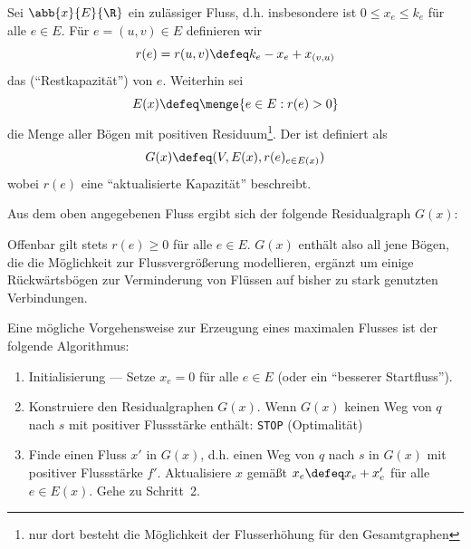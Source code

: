 \begin{definition}
	Sei $\abb{x}{E}{\R}$ ein zulässiger Fluss, d.h. insbesondere ist $0 \le x_e \le k_e$ für alle $e \in E$. Für $e = (u,v) \in E$ definieren wir
	\begin{equation*}
		r(e) = r(u,v) \defeq k_e - x_e + x_{(v,u)}
	\end{equation*}
	das  (\enquote{Restkapazität}) von $e$.
	Weiterhin sei
	\begin{equation*}
		E(x) \defeq \menge{e \in E : r(e) > 0}
	\end{equation*}
	die Menge aller Bögen mit positiven Residuum\footnote{nur dort besteht die Möglichkeit der Flusserhöhung für den Gesamtgraphen}. Der  ist definiert als 
	\begin{equation*}
		G(x) \defeq (V, E(x), r(e)_{e \in E(x)})
	\end{equation*}
	wobei $r(e)$ eine \enquote{aktualisierte Kapazität} beschreibt.
\end{definition}

\begin{beispiel}
	Aus dem oben angegebenen Fluss ergibt sich der folgende Residualgraph $G(x)$:
	
	Offenbar gilt stets $r(e) \ge 0$ für alle $e \in E$. $G(x)$ enthält also all jene Bögen, die die Möglichkeit zur Flussvergrößerung modellieren, ergänzt um einige Rückwärtsbögen zur Verminderung von Flüssen auf bisher zu stark genutzten Verbindungen.
\end{beispiel}

Eine mögliche Vorgehensweise zur Erzeugung eines maximalen Flusses ist der folgende Algorithmus:

\begin{enumerate}[label=Schritt \arabic*:, leftmargin=*, start=1]
	\item Initialisierung --- Setze $x_e = 0$ für alle $e \in E$ (oder ein \enquote{besserer Startfluss}).
	\item Konstruiere den Residualgraphen $G(x)$. Wenn $G(x)$ keinen Weg von $q$ nach $s$ mit positiver Flussstärke enthält: \texttt{STOP} (Optimalität)
	\item Finde einen Fluss $x'$ in $G(x)$, d.h. einen Weg von $q$ nach $s$ in $G(x)$ mit positiver Flussstärke $f'$. Aktualisiere $x$ gemäßt $x_e \defeq x_e + x_e'$ für alle $e \in E(x)$. Gehe zu Schritt~2.
\end{enumerate}

